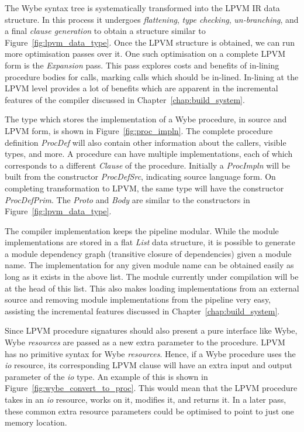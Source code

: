 The Wybe syntax tree is systematically transformed into the LPVM IR data
structure. In this process it undergoes \textit{flattening}, \textit{type
  checking}, \textit{un-branching}, and a final \textit{clause generation} to
obtain a structure similar to Figure~\ref{fig:lpvm_data_type}. Once the LPVM
structure is obtained, we can run more optimisation passes over it. One such
optimisation on a complete LPVM form is the \textit{Expansion} pass. This pass
explores costs and benefits of in-lining procedure bodies for calls, marking
calls which should be in-lined. In-lining at the LPVM level provides a lot of
benefits which are apparent in the incremental features of the compiler
discussed in Chapter~\ref{chap:build_system}.

The type which stores the implementation of a Wybe procedure, in source and
LPVM form, is shown in Figure~\ref{fig:proc_impln}. The complete procedure
definition \textit{ProcDef} will also contain other information about the
callers, visible types, and more. A procedure can have multiple
implementations, each of which corresponds to a different \textit{Clause} of
the procedure. Initially a \textit{ProcImpln} will be built from the
constructor \textit{ProcDefSrc}, indicating source language form. On completing
transformation to LPVM, the same type will have the constructor
\textit{ProcDefPrim}. The \textit{Proto} and \textit{Body} are similar to the
constructors in Figure~\ref{fig:lpvm_data_type}.

The compiler implementation keeps the pipeline modular. While the module
implementations are stored in a flat \textit{List} data structure, it is
possible to generate a module dependency graph (transitive closure of
dependencies) given a module name. The implementation for any given module name
can be obtained easily as long as it exists in the above list. The module
currently under compilation will be at the head of this list. This also makes
loading implementations from an external source and removing module
implementations from the pipeline very easy, assisting the incremental features
discussed in Chapter~\ref{chap:build_system}.

Since LPVM procedure signatures should also present a pure interface like Wybe,
Wybe \textit{resources} are passed as a new extra parameter to the
procedure. LPVM has no primitive syntax for Wybe \textit{resources}. Hence, if
a Wybe procedure uses the \textit{io} resource, its corresponding LPVM clause
will have an extra input and output parameter of the \textit{io} type. An
example of this is shown in Figure~\ref{fig:wybe_convert_to_proc}. This would
mean that the LPVM procedure takes in an \textit{io} resource, works on it,
modifies it, and returns it. In a later pass, these common extra resource
parameters could be optimised to point to just one memory location.

